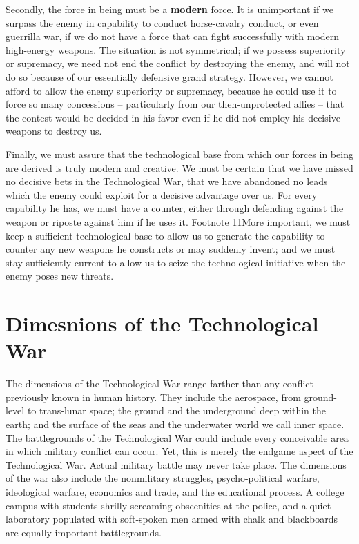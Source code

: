 \documentclass[a4paper,12pt]{book}
\begin{document}
Secondly, the force in being must be a \textbf{modern} force. It is unimportant if we surpass the enemy in capability to conduct horse-cavalry conduct, or even guerrilla war, if we do not have a force that can fight successfully with modern high-energy weapons. The situation is not symmetrical; if we possess superiority or supremacy, we need not end the conflict by destroying the enemy, and will not do so because of our essentially defensive grand strategy. However, we cannot afford to allow the enemy superiority or supremacy, because he could use it to force so many concessions -- particularly from our then-unprotected allies -- that the contest would be decided in his favor even if he did not employ his decisive weapons to destroy us.

Finally, we must assure that the technological base from which our forces in being are derived is truly modern and creative. We must be certain that we have missed no decisive bets in the Technological War, that we have abandoned no leads which the enemy could exploit for a decisive advantage over us. For every capability he has, we must have a counter, either through defending against the weapon or riposte against him if he uses it. Footnote 11More important, we must keep a sufficient technological base to allow us to generate the capability to counter any new weapons he constructs or may suddenly invent; and we must stay sufficiently current to allow us to seize the technological initiative when the enemy poses new threats.

\section{Dimesnions of the Technological War}
The dimensions of the Technological War range farther than any conflict previously known in human history. They include the aerospace, from ground-level to trans-lunar space; the ground and the underground deep within the earth; and the surface of the seas and the underwater world we call inner space. The battlegrounds of the Technological War could include every conceivable area in which military conflict can occur. Yet, this is merely the endgame aspect of the Technological War. Actual military battle may never take place. The dimensions of the war also include the nonmilitary struggles, psycho-political warfare, ideological warfare, economics and trade, and the educational process. A college campus with students shrilly screaming obscenities at the police, and a quiet laboratory populated with soft-spoken men armed with chalk and blackboards are equally important battlegrounds.
\end{document}
